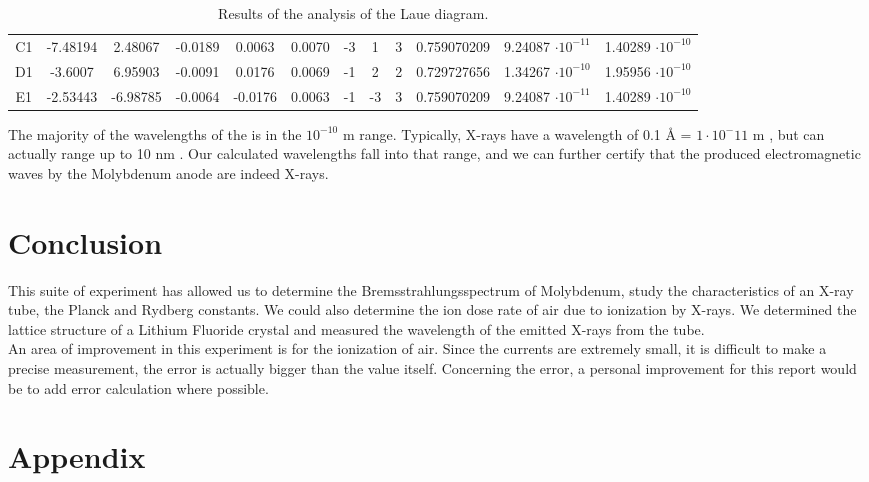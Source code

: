 \documentclass{scrartcl}
\begin{document}
\begin{table}[!ht]
{\begin{tabular}{c|c|c|c|c|c|c|c|c|c|c|c}
        C1 & -7.48194 & 2.48067 &  -0.0189 &  0.0063  &  0.0070  & -3 & 1 & 3 & 0.759070209 & 9.24087 $\cdot 10^{-11}$ & 1.40289 $\cdot 10^{-10}$  \\ 
        D1 & -3.6007 & 6.95903 &  -0.0091 &  0.0176  &  0.0069  & -1 & 2 & 2 & 0.729727656 & 1.34267 $\cdot 10^{-10}$ & 1.95956 $\cdot 10^{-10}$  \\ 
        E1 & -2.53443 & -6.98785 &  -0.0064 &  -0.0176 &  0.0063  & -1 & -3 & 3 & 0.759070209 & 9.24087 $\cdot 10^{-11}$ & 1.40289 $\cdot 10^{-10}$ 
    \end{tabular}}
    \caption{Results of the analysis of the Laue diagram.  }
    \label{tab:laueRes}
\end{table}
\FloatBarrier

\noindent The majority of the wavelengths of the is in the $10^{-10}$ m range. Typically, X-rays have a wavelength of 0.1 \r{A} = $1 \cdot 10^-11$ m \cite{xrayWavelength}, but can actually range up to 10 nm \cite{xrayMaxWavelength}. Our calculated wavelengths fall into that range, and we can further certify that the produced electromagnetic waves by the Molybdenum anode are indeed X-rays.

\section{Conclusion}

This suite of experiment has allowed us to determine the Bremsstrahlungsspectrum of Molybdenum, study the characteristics of an X-ray tube, the Planck and Rydberg constants. We could also determine the ion dose rate of air due to ionization by X-rays. We determined the lattice structure of a Lithium Fluoride crystal and measured the wavelength of the emitted X-rays from the tube. \\ An area of improvement in this experiment is for the ionization of air. Since the currents are extremely small, it is difficult to make a precise measurement, the error is actually bigger than the value itself. Concerning the error, a personal improvement for this report would be to add error calculation where possible.

\section{Appendix}
\end{document}
